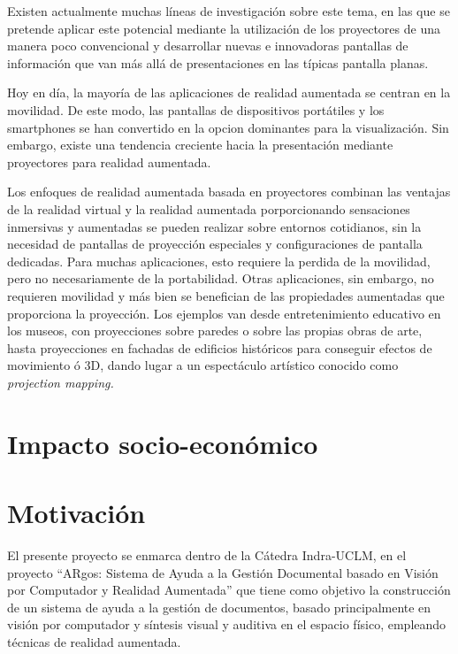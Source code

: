 Existen actualmente muchas líneas de investigación sobre este tema, en las que se pretende aplicar este potencial mediante la utilización de los proyectores de una manera poco convencional y desarrollar nuevas e innovadoras pantallas de información que van más allá de presentaciones en las típicas pantalla planas.
 

Hoy en día, la mayoría de las aplicaciones de realidad aumentada se centran en la movilidad. De este modo, las pantallas de dispositivos portátiles y los smartphones se han convertido en la opcion dominantes para la visualización. Sin embargo, existe una tendencia creciente hacia la presentación mediante proyectores para realidad aumentada. 

Los enfoques de realidad aumentada basada en proyectores combinan las ventajas de la realidad virtual y la realidad aumentada porporcionando sensaciones inmersivas y aumentadas se pueden realizar sobre entornos cotidianos, sin la necesidad de pantallas de proyección especiales y configuraciones de pantalla dedicadas. Para muchas aplicaciones, esto requiere la perdida de la movilidad, pero no necesariamente de la portabilidad. Otras aplicaciones, sin embargo, no requieren movilidad y más bien se benefician de las propiedades aumentadas que proporciona la proyección. Los ejemplos van desde entretenimiento educativo en los museos, con proyecciones sobre paredes o sobre las propias obras de arte, hasta proyecciones en fachadas de edificios históricos para conseguir efectos de movimiento ó 3D, dando lugar a un espectáculo artístico conocido como \emph{projection mapping.}

\section{Impacto socio-económico}

\section{Motivación}
  El presente proyecto se enmarca dentro de la Cátedra Indra-UCLM, en el proyecto “ARgos: Sistema de Ayuda a la Gestión Documental basado en Visión por Computador y Realidad Aumentada” que tiene como objetivo la construcción de un sistema de ayuda a la gestión de documentos, basado principalmente en visión por computador y síntesis visual y auditiva en el espacio físico, empleando técnicas de realidad aumentada.  
  
